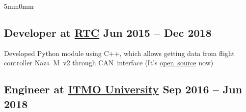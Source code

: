 \documentclass[10pt]{article}
\newcommand{\lmvalue}{5mm}
\newcommand{\rmvalue}{0mm}
\begin{document}
\begin{changemargin}{\lmvalue}{\rmvalue}
	\subsection*{Developer at \href{https://er.rtc.ru/en/}{RTC}
		\hfill {\color{gray}Jun 2015 – Dec 2018}}

	Developed Python module using C++, which allows getting data from flight controller Naza~M~v2 through
	CAN~interface (It's \href{https://github.com/viktorvorobev/NazaCanDecoder}{open~source} now)

	\subsection*{Engineer at \href{https://en.itmo.ru/}{ITMO University}
		\hfill {\color{gray}Sep 2016 – Jun 2018}}

\end{changemargin}
\end{document}
